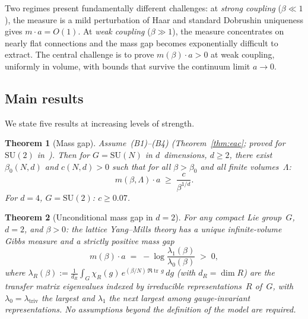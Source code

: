 \documentclass[11pt,a4paper]{article}
\theoremstyle{plain}
\newtheorem{theorem}{Theorem}[section]
\theoremstyle{definition}
\theoremstyle{remark}
\newcommand{\tr}{\operatorname{tr}}
\newcommand{\SU}{\mathrm{SU}}
\begin{document}
Two regimes present fundamentally different challenges:
at \emph{strong coupling} ($\beta \ll 1$), the measure is a
mild perturbation of Haar and standard Dobrushin uniqueness
gives $m \cdot a = O(1)$.  At \emph{weak coupling}
($\beta \gg 1$), the measure concentrates on nearly flat
connections and the mass gap becomes exponentially difficult
to extract.  The central challenge is to prove
$m(\beta) \cdot a > 0$ at weak coupling, uniformly in volume,
with bounds that survive the continuum limit $a \to 0$.

\subsection{Main results}

We state five results at increasing levels of strength.

\begin{theorem}[Mass gap]\label{thm:conditional}
Assume~\textup{(B1)--(B4)} \textup{(Theorem~\ref{thm:eac};
proved for $\SU(2)$ in~\cite{FontesSU2})}.
Then for $G = \SU(N)$ in $d$~dimensions, $d \geq 2$, there
exist $\beta_0(N, d)$ and $c(N, d) > 0$ such that for all
$\beta > \beta_0$ and all finite volumes~$\Lambda$:
\begin{equation}\label{eq:conditional_gap}
  m(\beta, \Lambda) \cdot a
  \;\geq\; \frac{c}{\beta^{1/d}}.
\end{equation}
For $d = 4$, $G = \SU(2)$: $c \geq 0.07$.
\end{theorem}

\begin{theorem}[Unconditional mass gap in $d = 2$]
\label{thm:d2}
For any compact Lie group~$G$, $d = 2$, and $\beta > 0$:
the lattice Yang--Mills theory has a unique infinite-volume
Gibbs measure and a strictly positive mass gap
\begin{equation}\label{eq:d2_gap}
  m(\beta) \cdot a
  \;=\; -\log\frac{\lambda_1(\beta)}{\lambda_0(\beta)}
  \;>\; 0,
\end{equation}
where $\lambda_R(\beta) :=
\frac{1}{d_R}\int_G \chi_R(g)\,e^{(\beta/N)\,\Re\tr\,g}\,dg$
(with $d_R = \dim R$)
are the transfer matrix eigenvalues indexed by irreducible
representations~$R$ of~$G$, with $\lambda_0 = \lambda_{\mathrm{triv}}$
the largest and $\lambda_1$ the next largest among
gauge-invariant representations.
No assumptions beyond the definition of the model are
required.\end{theorem}
\end{document}
